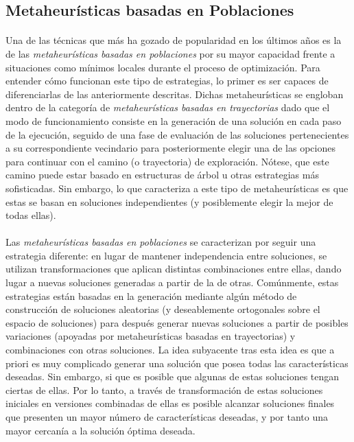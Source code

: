 \documentclass{subfiles}
\begin{document}
      \subsection{Metaheurísticas basadas en Poblaciones}
      \label{sec:solving_population_metaheuristics}

        \paragraph{}
        Una de las técnicas que más ha gozado de popularidad en los últimos años es la de las \emph{metaheurísticas basadas en poblaciones} por su mayor capacidad frente a situaciones como mínimos locales durante el proceso de optimización. Para entender cómo funcionan este tipo de estrategias, lo primer es ser capaces de diferenciarlas de las anteriormente descritas. Dichas metaheurísticas se engloban dentro de la categoría de \emph{metaheurísticas basadas en trayectorias} dado que el modo de funcionamiento consiste en la generación de una solución en cada paso de la ejecución, seguido de una fase de evaluación de las soluciones pertenecientes a su correspondiente vecindario para posteriormente elegir una de las opciones para continuar con el camino (o trayectoria) de exploración. Nótese, que este camino puede estar basado en estructuras de árbol u otras estrategias más sofisticadas. Sin embargo, lo que caracteriza a este tipo de metaheurísticas es que estas se basan en  soluciones independientes (y posiblemente elegir la mejor de todas ellas).

      \paragraph{}
      Las \emph{metaheurísticas basadas en poblaciones} se caracterizan por seguir una estrategia diferente: en lugar de mantener independencia entre soluciones, se utilizan transformaciones que aplican distintas combinaciones entre ellas, dando lugar a nuevas soluciones generadas a partir de la  de otras. Comúnmente, estas estrategias están basadas en la generación mediante algún método de construcción de soluciones aleatorias (y deseablemente ortogonales sobre el espacio de soluciones) para después generar nuevas soluciones a partir de posibles variaciones (apoyadas por metaheurísticas basadas en trayectorias) y combinaciones con otras soluciones. La idea subyacente tras esta idea es que a priori es muy complicado generar una solución que posea todas las características deseadas. Sin embargo, si que es posible que algunas de estas soluciones tengan ciertas de ellas. Por lo tanto, a través de transformación de estas soluciones iniciales en versiones combinadas de ellas es posible alcanzar soluciones finales que presenten un mayor número de características deseadas, y por tanto una mayor cercanía a la solución óptima deseada.
\end{document}
